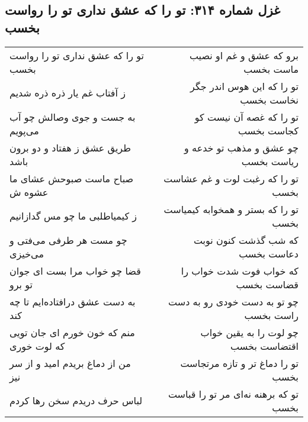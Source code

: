 \begin{center}
\section*{غزل شماره ۳۱۴: تو را که عشق نداری تو را رواست بخسب}
\label{sec:0314}
\begin{longtable}{l p{0.5cm} r}
تو را که عشق نداری تو را رواست بخسب
&&
برو که عشق و غم او نصیب ماست بخسب
\\
ز آفتاب غم یار ذره ذره شدیم
&&
تو را که این هوس اندر جگر نخاست بخسب
\\
به جست و جوی وصالش چو آب می‌پویم
&&
تو را که غصه آن نیست کو کجاست بخسب
\\
طریق عشق ز هفتاد و دو برون باشد
&&
چو عشق و مذهب تو خدعه و ریاست بخسب
\\
صباح ماست صبوحش عشای ما عشوه ش
&&
تو را که رغبت لوت و غم عشاست بخسب
\\
ز کیمیاطلبی ما چو مس گدازانیم
&&
تو را که بستر و همخوابه کیمیاست بخسب
\\
چو مست هر طرفی می‌فتی و می‌خیزی
&&
که شب گذشت کنون نوبت دعاست بخسب
\\
قضا چو خواب مرا بست ای جوان تو برو
&&
که خواب فوت شدت خواب را قضاست بخسب
\\
به دست عشق درافتاده‌ایم تا چه کند
&&
چو تو به دست خودی رو به دست راست بخسب
\\
منم که خون خورم ای جان تویی که لوت خوری
&&
چو لوت را به یقین خواب اقتضاست بخسب
\\
من از دماغ بریدم امید و از سر نیز
&&
تو را دماغ تر و تازه مرتجاست بخسب
\\
لباس حرف دریدم سخن رها کردم
&&
تو که برهنه نه‌ای مر تو را قباست بخسب
\\
\end{longtable}
\end{center}
